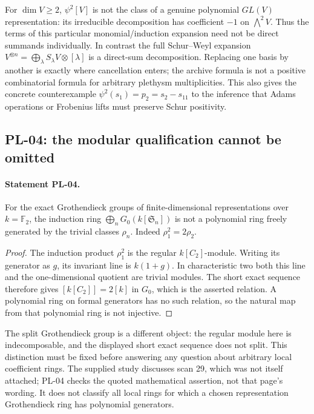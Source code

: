 For $\dim V\geq2$, $\psi^2[V]$ is not the class of a genuine polynomial
$GL(V)$ representation: its irreducible decomposition has coefficient $-1$
on $\bigwedge^2V$. Thus the terms of this particular monomial/induction
expansion need not be direct summands individually. In contrast the full
Schur--Weyl expansion
$V^{\otimes n}=\bigoplus_\lambda S_\lambda V\otimes[\lambda]$
is a direct-sum decomposition. Replacing one basis by another is exactly
where cancellation enters; the archive formula is not a positive combinatorial
formula for arbitrary plethysm multiplicities. This also gives the concrete
counterexample $\psi^2(s_1)=p_2=s_2-s_{11}$ to the inference that Adams
operations or Frobenius lifts must preserve Schur positivity.

\subsection{PL-04: the modular qualification cannot be omitted}
\paragraph{Statement PL-04.}
For the exact Grothendieck groups of finite-dimensional representations over
$k=\mathbb F_2$, the induction ring
$\bigoplus_nG_0(k[\mathfrak S_n])$ is not a polynomial ring freely generated
by the trivial classes $\rho_n$. Indeed $\rho_1^2=2\rho_2$.

\begin{proof}
The induction product $\rho_1^2$ is the regular $k[C_2]$-module.
Writing its generator as $g$, its invariant line is $k(1+g)$. In
characteristic two both this line and the one-dimensional quotient are
trivial modules. The short exact sequence therefore gives
$[k[C_2]]=2[k]$ in $G_0$, which is the asserted relation. A polynomial ring
on formal generators has no such relation, so the natural map from that
polynomial ring is not injective.
\end{proof}

The split Grothendieck group is a different object: the regular module here
is indecomposable, and the displayed short exact sequence does not split.
This distinction must be fixed before answering any question about arbitrary
local coefficient rings. The supplied study discusses scan 29, which was not
itself attached; PL-04 checks the quoted mathematical assertion, not that
page's wording. It does not classify all local rings for which a chosen
representation Grothendieck ring has polynomial generators.

